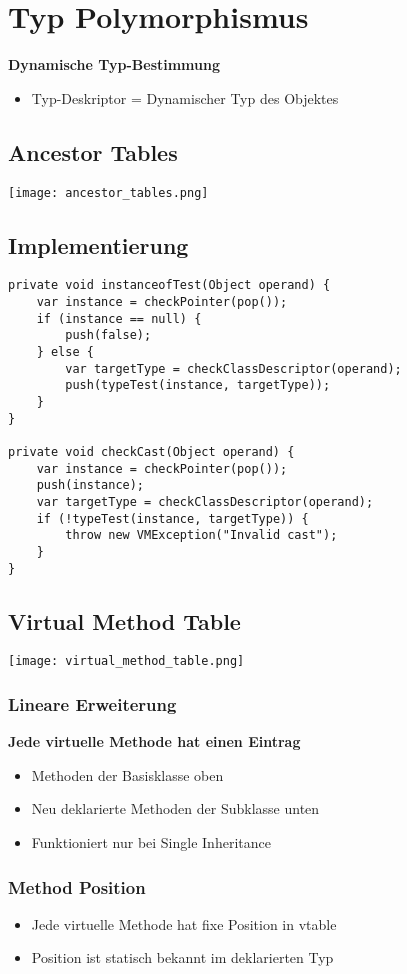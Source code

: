 \section{Typ Polymorphismus}
\textbf{Dynamische Typ-Bestimmung}
\begin{itemize}
    \item Typ-Deskriptor = Dynamischer Typ des Objektes
\end{itemize}
\subsection{Ancestor Tables}
\texttt{[image: ancestor\_tables.png]}
\subsection{Implementierung}
\begin{lstlisting}
private void instanceofTest(Object operand) {
    var instance = checkPointer(pop());
    if (instance == null) {
        push(false);
    } else {
        var targetType = checkClassDescriptor(operand);
        push(typeTest(instance, targetType));
    }
}

private void checkCast(Object operand) {
    var instance = checkPointer(pop());
    push(instance);
    var targetType = checkClassDescriptor(operand);
    if (!typeTest(instance, targetType)) {
        throw new VMException("Invalid cast");
    }
}
\end{lstlisting}

\subsection{Virtual Method Table}
\texttt{[image: virtual\_method\_table.png]}
\subsubsection{Lineare Erweiterung}
\textbf{Jede virtuelle Methode hat einen Eintrag}
\begin{itemize}
    \item Methoden der Basisklasse oben
    \item Neu deklarierte Methoden der Subklasse unten
    \item Funktioniert nur bei Single Inheritance
\end{itemize}
\subsubsection{Method Position}
\begin{itemize}
    \item Jede virtuelle Methode hat fixe Position in vtable
    \item Position ist statisch bekannt im deklarierten Typ
\end{itemize}
